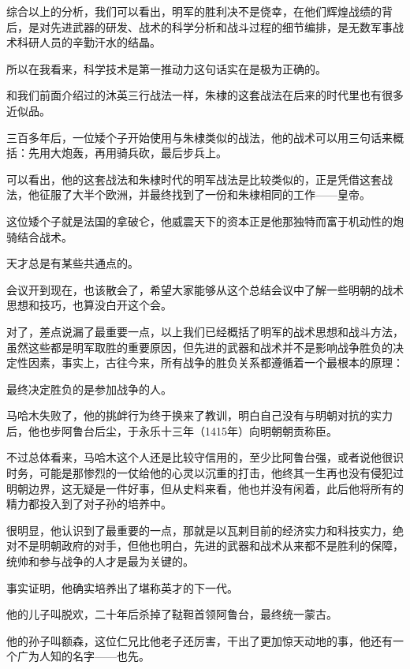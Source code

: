 \begin{multicols}{\theparacolNo}
综合以上的分析，我们可以看出，明军的胜利决不是侥幸，在他们辉煌战绩的背后，是对先进武器的研发、战术的科学分析和战斗过程的细节编排，是无数军事战术科研人员的辛勤汗水的结晶。

所以在我看来，科学技术是第一推动力这句话实在是极为正确的。

和我们前面介绍过的沐英三行战法一样，朱棣的这套战法在后来的时代里也有很多近似品。

三百多年后，一位矮个子开始使用与朱棣类似的战法，他的战术可以用三句话来概括：先用大炮轰，再用骑兵砍，最后步兵上。

可以看出，他的这套战法和朱棣时代的明军战法是比较类似的，正是凭借这套战法，他征服了大半个欧洲，并最终找到了一份和朱棣相同的工作——皇帝。

这位矮个子就是法国的拿破仑，他威震天下的资本正是他那独特而富于机动性的炮骑结合战术。

天才总是有某些共通点的。

会议开到现在，也该散会了，希望大家能够从这个总结会议中了解一些明朝的战术思想和技巧，也算没白开这个会。

对了，差点说漏了最重要一点，以上我们已经概括了明军的战术思想和战斗方法，虽然这些都是明军取胜的重要原因，但先进的武器和战术并不是影响战争胜负的决定性因素，事实上，古往今来，所有战争的胜负关系都遵循着一个最根本的原理：

最终决定胜负的是参加战争的人。

马哈木失败了，他的挑衅行为终于换来了教训，明白自己没有与明朝对抗的实力后，他也步阿鲁台后尘，于永乐十三年（1415年）向明朝朝贡称臣。

不过总体看来，马哈木这个人还是比较守信用的，至少比阿鲁台强，或者说他很识时务，可能是那惨烈的一仗给他的心灵以沉重的打击，他终其一生再也没有侵犯过明朝边界，这无疑是一件好事，但从史料来看，他也并没有闲着，此后他将所有的精力都投入到了对子孙的培养中。

很明显，他认识到了最重要的一点，那就是以瓦剌目前的经济实力和科技实力，绝对不是明朝政府的对手，但他也明白，先进的武器和战术从来都不是胜利的保障，统帅和参与战争的人才是最为关键的。

事实证明，他确实培养出了堪称英才的下一代。

他的儿子叫脱欢，二十年后杀掉了鞑靼首领阿鲁台，最终统一蒙古。

他的孙子叫额森，这位仁兄比他老子还厉害，干出了更加惊天动地的事，他还有一个广为人知的名字——也先。
\ifnum{}
	\end{multicols}
\fi
\newpage

